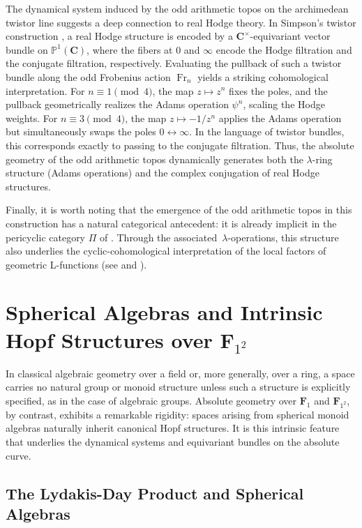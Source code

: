 \documentclass[11pt,a4paper]{article}
\newcommand{\C}{\mathbf{C}}
\newcommand{\Fone}{\mathbf{F}_{1}}
\newcommand{\Ftwo}{\mathbf{F}_{1^2}}
\newcommand{\frob}{{\operatorname{Fr}}}
\begin{document}
The dynamical system induced by the odd arithmetic topos on the archimedean twistor line suggests a deep connection to real Hodge theory. In Simpson's twistor construction \cite{Si}, a  real Hodge structure is encoded by a $\C^\times$-equivariant vector bundle on $\mathbb{P}^1(\C)$, where the fibers at $0$ and $\infty$ encode the Hodge filtration and the conjugate filtration, respectively. 
Evaluating the pullback of such a twistor bundle along the odd Frobenius action $\frob_n$ yields a striking cohomological interpretation. For $n \equiv 1 \pmod 4$, the map $z \mapsto z^n$ fixes the poles, and the pullback geometrically realizes the Adams operation $\psi^n$, scaling the Hodge weights. For $n \equiv 3 \pmod 4$, the map $z \mapsto -1/z^n$ applies the Adams operation but simultaneously swaps the poles $0 \leftrightarrow \infty$. In the language of twistor bundles, this corresponds exactly to passing to the conjugate filtration. Thus, the absolute geometry of the odd arithmetic topos dynamically generates both the $\lambda$-ring structure (Adams operations) and the complex conjugation of real Hodge structures.\vspace{.03in}

Finally, it is worth noting that the emergence of the odd arithmetic topos in this
construction has a natural categorical antecedent: it is already implicit in
the pericyclic category $\Pi$ of \cite{CC4}. Through the associated $\lambda$-operations, this structure also underlies the cyclic-cohomological interpretation of the local factors of geometric L-functions (see \cite{CC8} and \cite{H}).



\section{Spherical Algebras and Intrinsic Hopf Structures over
\texorpdfstring{$\Ftwo$}{F1-squared}}\label{sect2}

In classical algebraic geometry over a field or, more generally, over a ring,
a space carries no natural group or monoid structure unless such a structure
is explicitly specified, as in the case of algebraic groups. Absolute
geometry over $\Fone$ and $\Ftwo$, by contrast, exhibits a remarkable
rigidity: spaces arising from spherical monoid algebras naturally inherit
canonical Hopf structures. It is this intrinsic feature that underlies the
dynamical systems and equivariant bundles on the absolute curve.


\subsection{The Lydakis-Day Product and Spherical Algebras}
\end{document}
